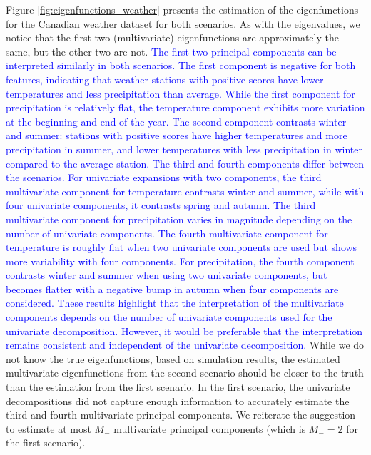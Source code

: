 Figure \ref{fig:eigenfunctions_weather} presents the estimation of the eigenfunctions for the Canadian weather dataset for both scenarios. As with the eigenvalues, we notice that the first two (multivariate) eigenfunctions are approximately the same, but the other two are not. \textcolor{blue}{The first two principal components can be interpreted similarly in both scenarios. The first component is negative for both features, indicating that weather stations with positive scores have lower temperatures and less precipitation than average. While the first component for precipitation is relatively flat, the temperature component exhibits more variation at the beginning and end of the year. The second component contrasts winter and summer: stations with positive scores have higher temperatures and more precipitation in summer, and lower temperatures with less precipitation in winter compared to the average station. The third and fourth components differ between the scenarios. For univariate expansions with two components, the third multivariate component for temperature contrasts winter and summer, while with four univariate components, it contrasts spring and autumn. The third multivariate component for precipitation varies in magnitude depending on the number of univariate components. The fourth multivariate component for temperature is roughly flat when two univariate components are used but shows more variability with four components. For precipitation, the fourth component contrasts winter and summer when using two univariate components, but becomes flatter with a negative bump in autumn when four components are considered. These results highlight that the interpretation of the multivariate components depends on the number of univariate components used for the univariate decomposition. However, it would be preferable that the interpretation remains consistent and independent of the univariate decomposition.} While we do not know the true eigenfunctions, based on simulation results, the estimated multivariate eigenfunctions from the second scenario should be closer to the truth than the estimation from the first scenario. In the first scenario, the univariate decompositions did not capture enough information to accurately estimate the third and fourth multivariate principal components. We reiterate the suggestion to estimate at most $M_{-}$ multivariate principal components (which is $M_{-} = 2$ for the first scenario).
